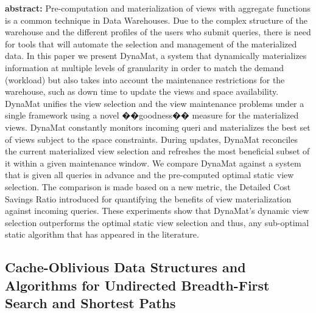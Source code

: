 \textbf{abstract:} Pre-computation and materialization of views with aggregate functions is a common technique in Data Warehouses. Due to the complex structure of the warehouse and the different profiles of the users who submit queries, there is need for tools that will automate the selection and management of the materialized data. In this paper we present DynaMat, a system that dynamically materializes information at multiple levels of granularity in order to match the demand (workload) but also takes into account the maintenance restrictions for the warehouse, such as down time to update the views and space availability. DynaMat unifies the view selection and the view maintenance problems under a single framework using a novel ��goodness�� measure for the materialized views. DynaMat constantly monitors incoming queri and materializes the best set of views subject to the space constraints. During updates, DynaMat reconciles the current materialized view selection and refreshes the most beneficial subset of it within a given maintenance window. We compare DynaMat against a system that is given all queries in advance and the pre-computed optimal static view selection. The comparison is made based on a new metric, the Detailed Cost Savings Ratio introduced for quantifying the benefits of view materialization against incoming queries. These experiments show that DynaMat's dynamic view selection outperforms the optimal static view selection and thus, any sub-optimal static algorithm that has appeared in the literature.
\cite{dynamat99}



\subsection{Cache-Oblivious Data Structures and Algorithms for Undirected Breadth-First Search and Shortest Paths}

